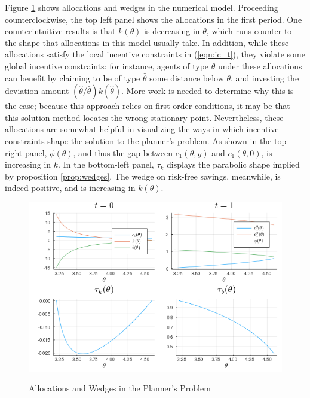 \documentclass[11pt]{article}
\begin{document}
Figure \ref{fig:two_pd} shows allocations and wedges in the numerical model. Proceeding counterclockwise, the top left panel shows the allocations in the first period. One counterintuitive results is that \( k\left( \theta \right) \) is decreasing in \( \theta \), which runs counter to the shape that allocations in this model usually take. In addition, while these allocations satisfy the local incentive constraints in (\ref{eqn:ic_t}), they violate some global incentive constraints: for instance, agents of type \( \bar{\theta} \) under these allocations can benefit by claiming to be of type \( \hat{\theta} \) some distance below \( \bar{\theta} \), and investing the deviation amount \( ( \hat{\theta}/\bar{\theta} )k( \hat{\theta} ) \). More work is needed to determine why this is the case; because this approach relies on first-order conditions, it may be that this solution method locates the wrong stationary point. Nevertheless, these allocations are somewhat helpful in visualizing the ways in which incentive constraints shape the solution to the planner's problem. As shown in the top right panel, \( \phi(\theta) \), and thus the gap between \( c_1\left( \theta,y \right) \) and \( c_1\left( \theta,0 \right) \), is increasing in \( k \). In the bottom-left panel, \( \tau_k \) displays the parabolic shape implied by proposition \ref{prop:wedges}. The wedge on risk-free savings, meanwhile, is indeed positive, and is increasing in \( k\left( \theta \right) \).
\begin{figure}[!htbp]
    \centering
    \caption{Allocations and Wedges in the Planner's Problem}
    \includegraphics[scale = 0.6]{figures/results_dual.png}
    \label{fig:two_pd}
\end{figure}
\end{document}
